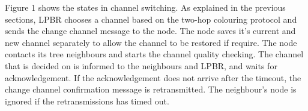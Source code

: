Figure 1 shows the states in channel switching. As explained in the previous sections, LPBR chooses a channel based on the two-hop colouring protocol and sends the change channel message to the node. The node saves it's current and new channel separately to allow the channel to be restored if require. The node contacts its tree neighbours and starts the channel quality checking. The channel that is decided on is informed to the neighbours and LPBR, and waits for acknowledgement. If the acknowledgement does not arrive after the timeout, the change channel confirmation message is retransmitted. The neighbour's node is ignored if the retransmissions has timed out. 



